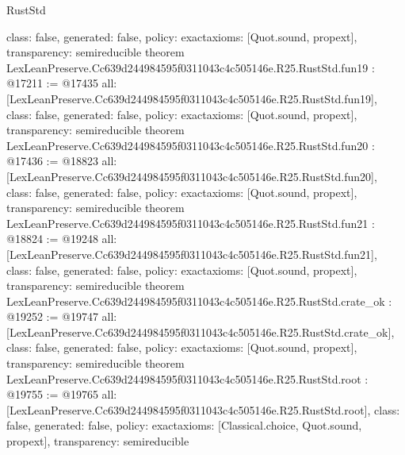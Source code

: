\begin{lexlean}{RustStd}
\begin{coremodule}
{  class: false,
  generated: false,
  policy: exact{axioms: [Quot.sound, propext]},
  transparency: semireducible
}
theorem LexLeanPreserve.Cc639d244984595f0311043c4c505146e.R25.RustStd.fun19 : @17211 := @17435 {
  all: [LexLeanPreserve.Cc639d244984595f0311043c4c505146e.R25.RustStd.fun19],
  class: false,
  generated: false,
  policy: exact{axioms: [Quot.sound, propext]},
  transparency: semireducible
}
theorem LexLeanPreserve.Cc639d244984595f0311043c4c505146e.R25.RustStd.fun20 : @17436 := @18823 {
  all: [LexLeanPreserve.Cc639d244984595f0311043c4c505146e.R25.RustStd.fun20],
  class: false,
  generated: false,
  policy: exact{axioms: [Quot.sound, propext]},
  transparency: semireducible
}
theorem LexLeanPreserve.Cc639d244984595f0311043c4c505146e.R25.RustStd.fun21 : @18824 := @19248 {
  all: [LexLeanPreserve.Cc639d244984595f0311043c4c505146e.R25.RustStd.fun21],
  class: false,
  generated: false,
  policy: exact{axioms: [Quot.sound, propext]},
  transparency: semireducible
}
theorem LexLeanPreserve.Cc639d244984595f0311043c4c505146e.R25.RustStd.crate_ok : @19252 := @19747 {
  all: [LexLeanPreserve.Cc639d244984595f0311043c4c505146e.R25.RustStd.crate_ok],
  class: false,
  generated: false,
  policy: exact{axioms: [Quot.sound, propext]},
  transparency: semireducible
}
theorem LexLeanPreserve.Cc639d244984595f0311043c4c505146e.R25.RustStd.root : @19755 := @19765 {
  all: [LexLeanPreserve.Cc639d244984595f0311043c4c505146e.R25.RustStd.root],
  class: false,
  generated: false,
  policy: exact{axioms: [Classical.choice, Quot.sound, propext]},
  transparency: semireducible
}


\end{coremodule}
\end{lexlean}
